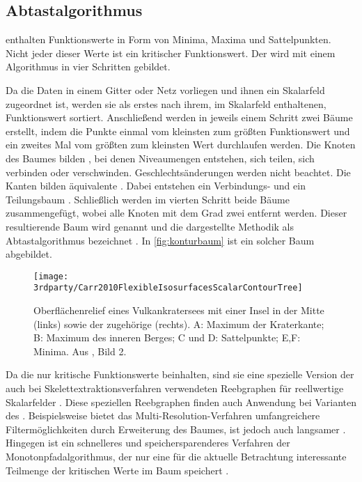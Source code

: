 \subsection*{Abtastalgorithmus}\label{sec:related:konturAbtast}
 enthalten Funktionswerte in Form von Minima, Maxima und Sattelpunkten. Nicht jeder dieser Werte ist ein kritischer Funktionswert. Der  wird mit einem Algorithmus in vier Schritten gebildet.

Da die Daten in einem Gitter oder Netz vorliegen und ihnen ein Skalarfeld zugeordnet ist, werden sie als erstes nach ihrem, im Skalarfeld enthaltenen, Funktionswert sortiert. Anschließend werden in jeweils einem Schritt zwei Bäume erstellt, indem die Punkte einmal vom kleinsten zum größten Funktionswert und ein zweites Mal vom größten zum kleinsten Wert durchlaufen werden. Die Knoten des Baumes bilden , bei denen Niveaumengen entstehen, sich teilen, sich verbinden oder verschwinden. Geschlechtsänderungen werden nicht beachtet. Die Kanten bilden äquivalente . Dabei entstehen ein Verbindungs- und ein Teilungsbaum \cite{carr2001computingCountourTrees_web}. Schließlich werden im vierten Schritt beide Bäume zusammengefügt, wobei alle Knoten mit dem Grad zwei entfernt werden. Dieser resultierende Baum wird  genannt und die dargestellte Methodik als Abtastalgorithmus bezeichnet \cite{carr2001computingCountourTrees} \cite[S.~176]{chiang2005contourTreesUsingMonotonePaths}. In \autoref{fig:konturbaum} ist ein solcher Baum abgebildet.

\begin{figure}
	\texttt{[image: 3rdparty/Carr2010FlexibleIsosurfacesScalarContourTree]}
	\caption{Oberflächenrelief eines Vulkankratersees mit einer Insel in der Mitte (links) sowie der zugehörige  (rechts). A: Maximum der Kraterkante; B: Maximum des inneren Berges; C und D: Sattelpunkte; E,F: Minima. Aus \cite[S.~44]{carr2010flexibleIsosurfaces}, Bild 2.}\label{fig:konturbaum}
\end{figure}

Da die  nur kritische Funktionswerte beinhalten, sind sie eine spezielle Version der auch bei Skelettextraktionsverfahren verwendeten Reebgraphen \cite{pascucci2007computationReebGraph} für reellwertige Skalarfelder \cite[S.~44]{carr2010flexibleIsosurfaces}. Diese speziellen Reebgraphen finden auch Anwendung bei Varianten des . Beispielsweise bietet das Multi-Resolution-Verfahren umfangreichere Filtermöglichkeiten durch Erweiterung des Baumes, ist jedoch auch langsamer \cite{pascucci2004multiResolutionComputation}. Hingegen ist ein schnelleres und speichersparenderes Verfahren der Monotonpfadalgorithmus, der nur eine für die aktuelle Betrachtung interessante Teilmenge der kritischen Werte im Baum speichert \cite{chiang2005contourTreesUsingMonotonePaths}.

